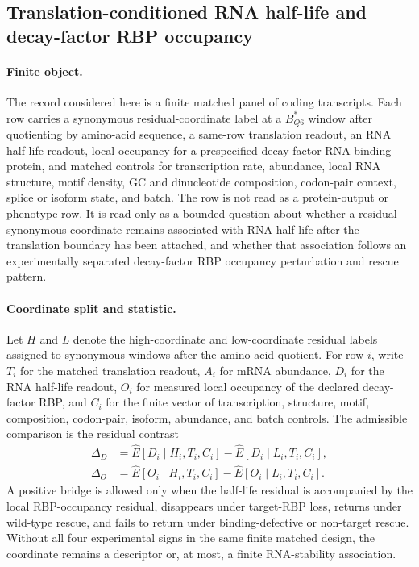\subsection{Translation-conditioned RNA half-life and decay-factor RBP occupancy}
\label{sec:q6-translation-conditioned-rna-half-life-rbp-bridge-cross-layer}

\paragraph{Finite object.}
The record considered here is a finite matched panel of coding transcripts.  Each row carries a synonymous residual-coordinate label at a $B^{*}_{Q6}$ window after quotienting by amino-acid sequence, a same-row translation readout, an RNA half-life readout, local occupancy for a prespecified decay-factor RNA-binding protein, and matched controls for transcription rate, abundance, local RNA structure, motif density, GC and dinucleotide composition, codon-pair context, splice or isoform state, and batch.  The row is not read as a protein-output or phenotype row.  It is read only as a bounded question about whether a residual synonymous coordinate remains associated with RNA half-life after the translation boundary has been attached, and whether that association follows an experimentally separated decay-factor RBP occupancy perturbation and rescue pattern.

\paragraph{Coordinate split and statistic.}
Let $H$ and $L$ denote the high-coordinate and low-coordinate residual labels assigned to synonymous windows after the amino-acid quotient.  For row $i$, write $T_i$ for the matched translation readout, $A_i$ for mRNA abundance, $D_i$ for the RNA half-life readout, $O_i$ for measured local occupancy of the declared decay-factor RBP, and $C_i$ for the finite vector of transcription, structure, motif, composition, codon-pair, isoform, abundance, and batch controls.  The admissible comparison is the residual contrast
$$
\begin{aligned}
\Delta_D
  &= \widehat{E}[D_i \mid H_i, T_i, C_i]
   - \widehat{E}[D_i \mid L_i, T_i, C_i],\\
\Delta_O
  &= \widehat{E}[O_i \mid H_i, T_i, C_i]
   - \widehat{E}[O_i \mid L_i, T_i, C_i].
\end{aligned}
$$
A positive bridge is allowed only when the half-life residual is accompanied by the local RBP-occupancy residual, disappears under target-RBP loss, returns under wild-type rescue, and fails to return under binding-defective or non-target rescue.  Without all four experimental signs in the same finite matched design, the coordinate remains a descriptor or, at most, a finite RNA-stability association.

